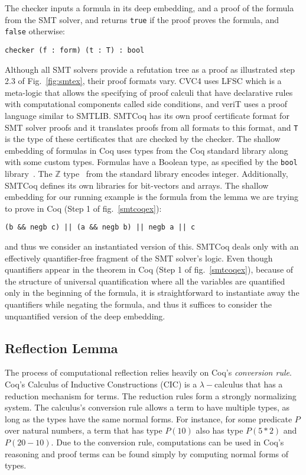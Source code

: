 \documentclass{article}
\begin{document}
	The checker inputs a formula in its 
	deep embedding, and a proof of the 
	formula from the SMT solver, and 
	returns \texttt{true} if the proof 
	proves the formula, and 
	\texttt{false} otherwise:
	\begin{center}
		\texttt{checker (f : 
			form) (t : T) : bool}	
	\end{center}
	Although all SMT solvers provide a
	refutation tree as a proof as 
	illustrated step 2.3 of 
	Fig.~\ref{fig:smtex},
	their proof formats vary. CVC4 
	uses LFSC which is a meta-logic
	that allows the specifying of 
	proof calculi that have declarative
	rules with computational components 
	called side conditions, and veriT
	uses a proof language similar to 
	SMTLIB. SMTCoq has its own proof 
	certificate format for SMT solver 
	proofs and it translates proofs 
	from all formats to this format, 
	and \texttt{T} is the type of 
	these certificates that are 
	checked by the checker. 
	The shallow embedding of formulas in 
	Coq uses types from the 
	Coq standard library along with 
	some custom types. Formulas have a 
	Boolean type, as specified by 
	the \texttt{bool} 
	library~\cite{CoqBool}. The 
	$\mathbb{Z}$ type~\cite{CoqZ}
	from the standard library encodes 
	integer. Additionally, SMTCoq 
	defines its own libraries for 
	bit-vectors and arrays. The shallow 
	embedding for our running example 
	is the formula from the lemma we 
	are trying to prove in Coq
	(Step 1 of fig.~\ref{smtcoqex}):
	\begin{center}
		\texttt{(b \&\& negb c) || (a 
			\&\& negb b) || negb a || c}
	\end{center}
	 
	and thus we consider an instantiated
	version of this. SMTCoq deals only 
	with an effectively quantifier-free
	fragment of the SMT solver's logic.
	Even though quantifiers appear in the 
	theorem in Coq (Step 1 of 
	fig.~\ref{smtcoqex}), because
	of the structure of universal 
	quantification where all the variables
	are quantified only in the beginning 
	of the formula, it is straightforward
	to instantiate away the quantifiers
	while negating the formula, and thus
	it suffices to consider the 
	unquantified version of the deep 
	embedding.
	
	\subsection{Reflection Lemma}
	\label{sec:refl}
	The process of computational 
	reflection relies heavily on 
	Coq's \textit{conversion rule}.
	Coq's Calculus of Inductive 
	Constructions (CIC) is a 
	$\lambda-$calculus that has a 
	reduction mechanism for terms. The
	reduction rules form a strongly 
	normalizing system. The calculus's
	conversion rule allows a term to 
	have multiple types, as long as the 
	types have the same normal forms. For 
	instance, for some predicate $P$ 
	over natural numbers, a term that 
	has type $P(10)$ also has type 
	$P(5*2)$ and $P(20-10)$. Due 
	to the conversion rule, 
	computations can be used in Coq's 
	reasoning and proof terms can be 
	found simply by computing normal 
	forms of types.
	
\end{document}
